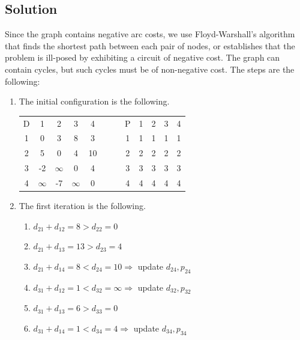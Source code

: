 \documentclass[12pt, a4paper]{report}
\newtheorem[style=M,bodystyle=\normalfont]{theorem}{Theorem}
\newtheorem[style=M,bodystyle=\normalfont]{corollary}{Corollary}
\newtheorem[style=M,bodystyle=\normalfont]{lemma}{Lemma}
\newtheorem[style=M,bodystyle=\normalfont]{definition}{Definition}
\begin{document}
    \subsection*{Solution}
        Since the graph contains negative arc costs, we use Floyd-Warshall's algorithm that finds the shortest path between each pair of nodes, or establishes that the 
        problem is ill-posed by exhibiting a circuit of negative cost. The graph can contain cycles, but such cycles must be of non-negative cost. The steps are the following: 
        \begin{enumerate}
            \item The initial configuration is the following. 
                \begin{table}[H]
                    \centering
                    \begin{tabular}{c|cccccc|cccc}
                    D & 1        & 2        & 3        & 4  & $\:\:\:\:\:\:$ & P & 1 & 2 & 3 & 4 \\ \cline{1-5} \cline{7-11} 
                    1 & 0        & 3        & 8        & 3  &                & 1 & 1 & 1 & 1 & 1 \\
                    2 & 5        & 0        & 4        & 10 &                & 2 & 2 & 2 & 2 & 2 \\
                    3 & -2       & $\infty$ & 0        & 4  &                & 3 & 3 & 3 & 3 & 3 \\
                    4 & $\infty$ & -7       & $\infty$ & 0  &                & 4 & 4 & 4 & 4 & 4
                    \end{tabular}
                \end{table}
            \item The first iteration is the following. 
                \begin{enumerate}
                    \item $d_{21} + d_{12} = 8 > d_{22} = 0$
                    \item $d_{21} + d_{13} = 13 > d_{23} = 4$
                    \item $d_{21} + d_{14} = 8 < d_{24} = 10 \Rightarrow$ update $d_{24}, p_{24}$
                    \item $d_{31} + d_{12} = 1 < d_{32} = \infty \Rightarrow$ update $d_{32}, p_{32}$
                    \item $d_{31} + d_{13} = 6 > d_{33} = 0$
                    \item $d_{31} + d_{14} = 1 < d_{34} = 4 \Rightarrow$ update $d_{34}, p_{34}$

\end{enumerate}
\end{enumerate}
\end{document}
